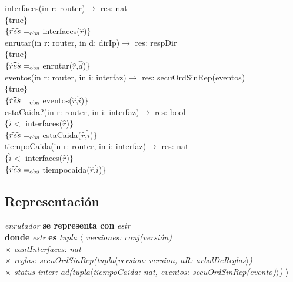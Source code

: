 interfaces(in r: router)$\longrightarrow$ res: nat\\
$\{$true$\}$\\
$\{\widehat{res} =_{\mathrm{obs}}$ interfaces($\widehat{r}$)$\}$\\

enrutar(in r: router, in d: dirIp)$\longrightarrow$ res: respDir\\
$\{$true$\}$\\
$\{\widehat{res} =_{\mathrm{obs}}$ enrutar($\widehat{r}$,$\widehat{d}$)$\}$\\

eventos(in r: router, in i: interfaz)$\longrightarrow$ res: secuOrdSinRep(eventos)\\
$\{$true$\}$\\
$\{\widehat{res} =_{\mathrm{obs}}$ eventos($\widehat{r}$,$\widehat{i}$)$\}$\\

estaCaida?(in r: router, in i: interfaz)$\longrightarrow$ res: bool\\
$\{\widehat{i} <$ interfaces($\widehat{r}$)$\}$\\
$\{\widehat{res} =_{\mathrm{obs}}$ estaCaida($\widehat{r}$,$\widehat{i}$)$\}$\\

tiempoCaida(in r: router, in i: interfaz)$\longrightarrow$ res: nat\\
$\{\widehat{i} <$ interfaces($\widehat{r}$)$\}$\\
$\{\widehat{res} =_{\mathrm{obs}}$ tiempocaida($\widehat{r}$,$\widehat{i}$)$\}$\\


\subsection*{Representaci\'on}
\textit{enrutador} \textbf{se representa con} \textit{estr}\\
\textbf{donde} \textit{estr} \textbf{es} \textit{tupla $\langle$ versiones: conj(versi\'on)\\
\hspace*{3.5cm} $\times$  cantInterfaces: nat\\
\hspace*{3.5cm} $\times$  reglas: secuOrdSinRep(tupla$\langle$version: version, aR: arbolDeReglas$\rangle$)\\ %
\hspace*{3.5cm} $\times$  status-inter: ad(tupla$\langle$tiempoCaida: nat, eventos: secuOrdSinRep(evento)$\rangle$) $\rangle$}


